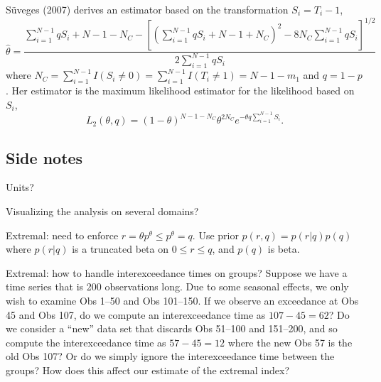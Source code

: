 \documentclass[12pt]{article}
\begin{document}
S{\"u}veges (2007) derives an estimator based on the transformation $S_i=T_i-1$,
\[ \hat{\theta} = \frac{ \sum_{i=1}^{N-1}qS_i +N-1-N_C-\left[\left(\sum_{i=1}^{N-1}qS_i+N-1+N_C\right)^2-8N_C\sum_{i=1}^{N-1}qS_i\right]^{1/2}}{2\sum_{i=1}^{N-1}qS_i} \]
where $N_C=\sum_{i=1}^{N-1}I(S_i\neq 0)=\sum_{i=1}^{N-1}I(T_i \neq 1)=N-1-m_1$ and $q=1-p$. Her estimator is the maximum likelihood estimator for the likelihood based on $S_i$,
\[ L_2(\theta, q)= (1-\theta)^{N-1-N_C}\theta^{2N_C}e^{-\theta q \sum_{i=1}^{N-1}S_i}. \]
\bigskip





\subsection*{Side notes}

Units?
\bigskip

Visualizing the analysis on several domains?
\bigskip

Extremal: need to enforce $r = \theta p^\theta \leq p^\theta = q$. Use prior $p(r,q)=p(r|q)p(q)$ where $p(r|q)$ is a truncated beta on $0\leq r \leq q$, and $p(q)$ is beta.
\bigskip

Extremal: how to handle interexceedance times on groups? Suppose we have a time series that is 200 observations long. Due to some seasonal effects, we only wish to examine Obs 1--50 and Obs 101--150. If we observe an exceedance at Obs 45 and Obs 107, do we compute an interexceedance time as $107-45=62$? Do we consider a ``new'' data set that discards Obs 51--100 and 151--200, and so compute the interexceedance time as $57-45=12$ where the new Obs 57 is the old Obs 107? Or do we simply ignore the interexceedance time between the groups? How does this affect our estimate of the extremal index?
\end{document}
